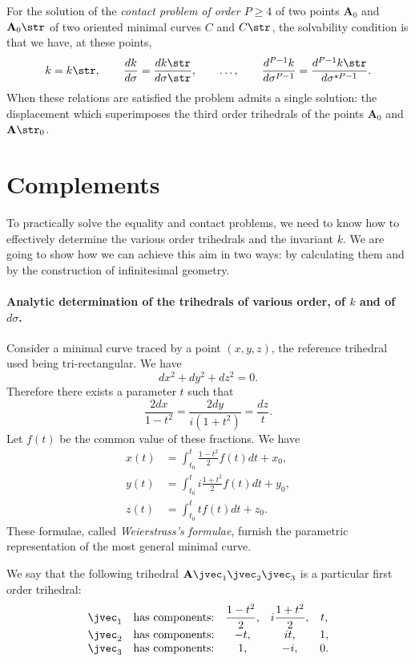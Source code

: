 \somespace

For the solution of the \emph{contact problem of order $P\ge 4$} of two points $\mathbf{A}_{0}$ and $\mathbf{A}_{0}\str$ of two oriented minimal curves $C$ and $C\str$, the solvability condition is that we have, at these points,
\[
k=k\str,\qquad \frac{dk}{d\sigma}=\frac{dk\str}{d\sigma\str},\qquad\dots,\qquad\frac{d^{P-1}k}{d\sigma^{P-1}}=\frac{d^{P-1}k\str}{d\sigma^{\star P-1}}.
\]
When these relations are satisfied the problem admits a single solution: the displacement which superimposes the third order trihedrals of the points $\mathbf{A}_{0}$ and $\mathbf{A}\str_{0}$.


\section{Complements}
\label{sec:complements}

To practically solve the equality and contact problems, we need to know how to effectively determine the various order trihedrals and the invariant $k$. We are going to show how we can achieve this aim in two ways: by calculating them and by the construction of infinitesimal geometry.

\paragraph{Analytic determination of the trihedrals of various order, of $k$ and of $d\sigma$.}
\label{sec:36}
Consider a minimal curve traced by a point $(x,y,z)$, the reference trihedral used being tri-rectangular. We have
\[
dx^{2}+dy^{2}+dz^{2}=0.
\]
Therefore there exists a parameter $t$ such that
\[
\frac{2dx}{1-t^{2}}=\frac{2dy}{i(1+t^{2})}=\frac{dz}{t}.
\]
Let $f(t)$ be the common value of these fractions. We have
\label{x:weierstrass}
\begin{align*}
  x(t)&=\int_{t_{0}}^{t}\frac{1-t^{2}}{2}f(t)dt+x_{0},\\
  y(t)&=\int_{t_{0}}^{t}i\frac{1+t^{2}}{2}f(t)dt+y_{0},\\
  z(t)&=\int_{t_{0}}^{t}tf(t)dt+z_{0}.
\end{align*}
These formulae, called \emph{Weierstrass's formulae}, furnish the parametric representation of the most general minimal curve.

We say that the following trihedral $\mathbf{A}\jvec_{1}\jvec_{2}\jvec_{3}$ is a particular first order trihedral:
\[
\begin{matrix}
  \jvec_{1}&\text{has components:}&\dfrac{1-t^{2}}{2},&i\dfrac{1+t^{2}}{2},&t,\\
  \jvec_{2}&\text{has components:}&-t,&it,&1,\\
  \jvec_{3}&\text{has components:}&1,&-i,&0.
\end{matrix}
\]

